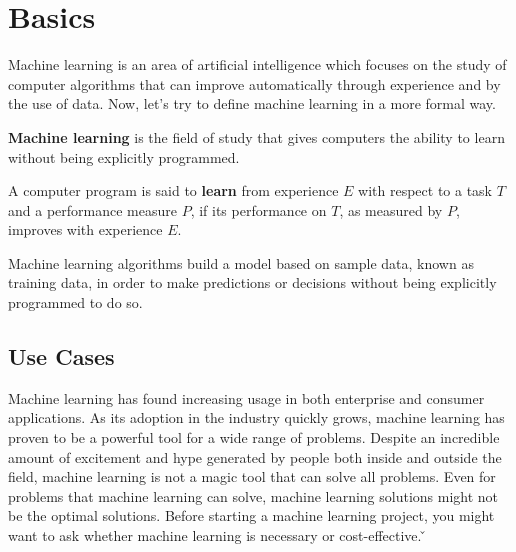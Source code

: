 \section{Basics}

Machine learning is an area of artificial intelligence which focuses on the study of computer algorithms that can
improve automatically through experience and by the use of data. Now, let's try to define machine learning in a more
formal way.

\textbf{Machine learning} is the field of study that gives computers the ability to learn without being explicitly
programmed.
\ed

A computer program is said to \textbf{learn} from experience $E$ with respect to a task $T$ and a performance measure
$P$, if its performance on $T$, as measured by $P$, improves with experience $E$.
\ed

Machine learning algorithms build a model based on sample data, known as training data, in order to make predictions
or decisions without being explicitly programmed to do so.

\subsection{Use Cases}

Machine learning has found increasing usage in both enterprise and consumer applications. As its adoption in the
industry quickly grows, machine learning has proven to be a powerful tool for a wide range of problems. Despite an
incredible amount of excitement and hype generated by people both inside and outside the field, machine learning is
not a magic tool that can solve all problems. Even for problems that machine learning can solve, machine learning
solutions might not be the optimal solutions. Before starting a machine learning project, you might want to ask
whether machine learning is necessary or cost-effective. \v

